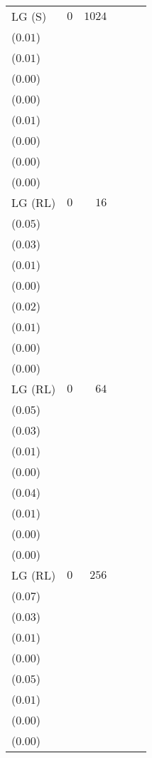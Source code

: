 \begin{table}[t]
\begin{tabular}{lrrrrr}
LG {\scriptsize(S)} & \(0\) & \(1024\) & \longcell{\(0.18\)\\{\tiny(\(0.01\))}} & \longcell{\(0.06\)\\{\tiny(\(0.01\))}} & \longcell{\(0.01\)\\{\tiny(\(0.00\))}} & \longcell{\(0.00\)\\{\tiny(\(0.00\))}} & \longcell{\(0.08\)\\{\tiny(\(0.01\))}} & \longcell{\(0.02\)\\{\tiny(\(0.00\))}} & \longcell{\(0.01\)\\{\tiny(\(0.00\))}} & \longcell{\(0.00\)\\{\tiny(\(0.00\))}} \\[2.2e\\[2.2ex]
LG {\scriptsize(RL)} & \(0\) & \(16\) & \longcell{\(0.19\)\\{\tiny(\(0.05\))}} & \longcell{\(0.08\)\\{\tiny(\(0.03\))}} & \longcell{\(0.02\)\\{\tiny(\(0.01\))}} & \longcell{\(0.00\)\\{\tiny(\(0.00\))}} & \longcell{\(0.07\)\\{\tiny(\(0.02\))}} & \longcell{\(0.03\)\\{\tiny(\(0.01\))}} & \longcell{\(0.01\)\\{\tiny(\(0.00\))}} & \longcell{\(0.00\)\\{\tiny(\(0.00\))}} \\[2.2e\\[2.2ex]
LG {\scriptsize(RL)} & \(0\) & \(64\) & \longcell{\(0.34\)\\{\tiny(\(0.05\))}} & \longcell{\(0.13\)\\{\tiny(\(0.03\))}} & \longcell{\(0.03\)\\{\tiny(\(0.01\))}} & \longcell{\(0.00\)\\{\tiny(\(0.00\))}} & \longcell{\(0.15\)\\{\tiny(\(0.04\))}} & \longcell{\(0.05\)\\{\tiny(\(0.01\))}} & \longcell{\(0.01\)\\{\tiny(\(0.00\))}} & \longcell{\(0.00\)\\{\tiny(\(0.00\))}} \\[2.2e\\[2.2ex]
LG {\scriptsize(RL)} & \(0\) & \(256\) & \longcell{\(0.45\)\\{\tiny(\(0.07\))}} & \longcell{\(0.17\)\\{\tiny(\(0.03\))}} & \longcell{\(0.04\)\\{\tiny(\(0.01\))}} & \longcell{\(0.01\)\\{\tiny(\(0.00\))}} & \longcell{\(0.23\)\\{\tiny(\(0.05\))}} & \longcell{\(0.07\)\\{\tiny(\(0.01\))}} & \longcell{\(0.01\)\\{\tiny(\(0.00\))}} & \longcell{\(0.00\)\\{\tiny(\(0.00\))}} \\[2.2e\\[2.2ex]

\end{tabular}
\end{table}
